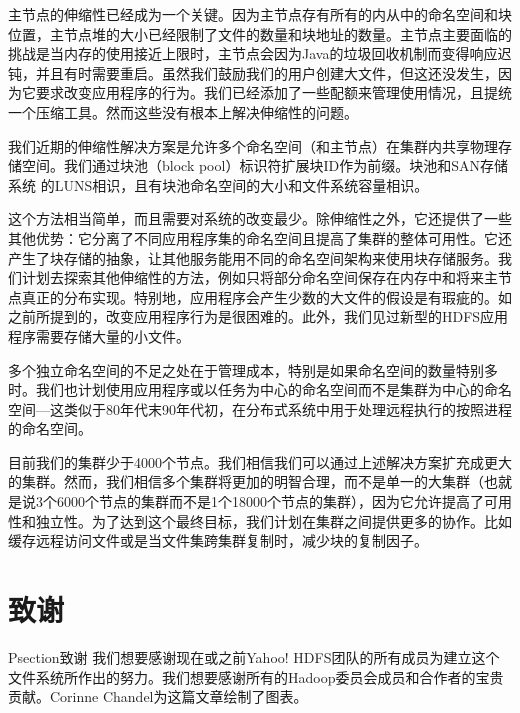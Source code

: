主节点的伸缩性已经成为一个关键。因为主节点存有所有的内从中的命名空间和块位置，主节点堆的大小已经限制了文件的数量和块地址的数量。主节点主要面临的挑战是当内存的使用接近上限时，主节点会因为Java的垃圾回收机制而变得响应迟钝，并且有时需要重启。虽然我们鼓励我们的用户创建大文件，但这还没发生，因为它要求改变应用程序的行为。我们已经添加了一些配额来管理使用情况，且提统一个压缩工具。然而这些没有根本上解决伸缩性的问题。

我们近期的伸缩性解决方案是允许多个命名空间（和主节点）在集群内共享物理存储空间。我们通过块池（block pool）标识符扩展块ID作为前缀。块池和SAN存储系统 的LUNS相识，且有块池命名空间的大小和文件系统容量相识。

这个方法相当简单，而且需要对系统的改变最少。除伸缩性之外，它还提供了一些其他优势：它分离了不同应用程序集的命名空间且提高了集群的整体可用性。它还产生了块存储的抽象，让其他服务能用不同的命名空间架构来使用块存储服务。我们计划去探索其他伸缩性的方法，例如只将部分命名空间保存在内存中和将来主节点真正的分布实现。特别地，应用程序会产生少数的大文件的假设是有瑕疵的。如之前所提到的，改变应用程序行为是很困难的。此外，我们见过新型的HDFS应用程序需要存储大量的小文件。

多个独立命名空间的不足之处在于管理成本，特别是如果命名空间的数量特别多时。我们也计划使用应用程序或以任务为中心的命名空间而不是集群为中心的命名空间—这类似于80年代末90年代初，在分布式系统中用于处理远程执行的按照进程的命名空间。

目前我们的集群少于4000个节点。我们相信我们可以通过上述解决方案扩充成更大的集群。然而，我们相信多个集群将更加的明智合理，而不是单一的大集群（也就是说3个6000个节点的集群而不是1个18000个节点的集群），因为它允许提高了可用性和独立性。为了达到这个最终目标，我们计划在集群之间提供更多的协作。比如缓存远程访问文件或是当文件集跨集群复制时，减少块的复制因子。

\section*{致谢}
P{section}{致谢}
我们想要感谢现在或之前Yahoo! HDFS团队的所有成员为建立这个文件系统所作出的努力。我们想要感谢所有的Hadoop委员会成员和合作者的宝贵贡献。Corinne Chandel为这篇文章绘制了图表。

